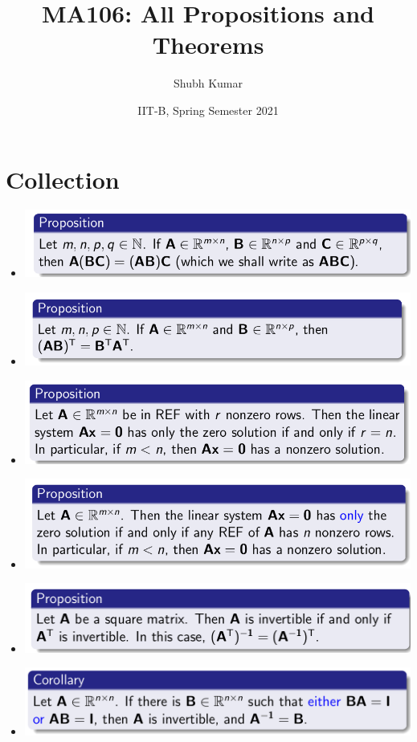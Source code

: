 \documentclass{article}
\title{MA106: All Propositions and Theorems}
\author{Shubh Kumar}
\date{IIT-B, Spring Semester 2021}
\begin{document}
\maketitle

\section{Collection}

\begin{itemize}
  \item \includegraphics[scale = 0.5]{8.png}
  \item \includegraphics[scale = 0.5]{9.png}
  \item \includegraphics[scale = 0.5]{10.png}
  \item \includegraphics[scale = 0.5]{11.png}
  \item \includegraphics[scale = 0.5]{12.png}
  \item \includegraphics[scale = 0.4]{13.png}

\end{itemize}
\end{document}
